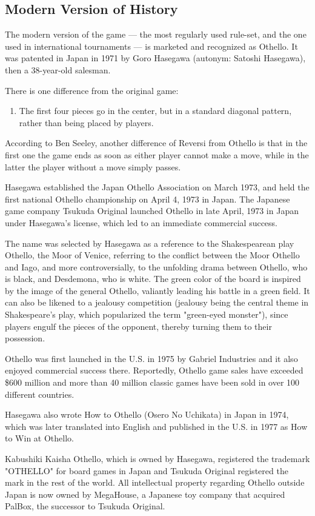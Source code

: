 \documentclass[a4paper]{report}
\begin{document}
\subsection{Modern Version of History}
The modern version of the game — the most regularly used rule-set, and the one used in international tournaments — is marketed and recognized as Othello. It was patented in Japan in 1971 by Goro Hasegawa (autonym: Satoshi Hasegawa), then a 38-year-old salesman.
\par
There is one difference from the original game: 
\begin{enumerate}
\item The first four pieces go in the center, but in a standard diagonal pattern, rather than being placed by players.
\end{enumerate}
According to Ben Seeley, another difference of Reversi from Othello is that in the first one the game ends as soon as either player cannot make a move, while in the latter the player without a move simply passes.
\par
Hasegawa established the Japan Othello Association on March 1973, and held the first national Othello championship on April 4, 1973 in Japan. The Japanese game company Tsukuda Original launched Othello in late April, 1973 in Japan under Hasegawa’s license, which led to an immediate commercial success.
\par
The name was selected by Hasegawa as a reference to the Shakespearean play Othello, the Moor of Venice, referring to the conflict between the Moor Othello and Iago, and more controversially, to the unfolding drama between Othello, who is black, and Desdemona, who is white. The green color of the board is inspired by the image of the general Othello, valiantly leading his battle in a green field. It can also be likened to a jealousy competition (jealousy being the central theme in Shakespeare's play, which popularized the term "green-eyed monster"), since players engulf the pieces of the opponent, thereby turning them to their possession. 
\par
Othello was first launched in the U.S. in 1975 by Gabriel Industries and it also enjoyed commercial success there. Reportedly, Othello game sales have exceeded \$600 million and more than 40 million classic games have been sold in over 100 different countries. 
\par
Hasegawa also wrote How to Othello (Osero No Uchikata) in Japan in 1974, which was later translated into English and published in the U.S. in 1977 as How to Win at Othello.
\par
Kabushiki Kaisha Othello, which is owned by Hasegawa, registered the trademark "OTHELLO" for board games in Japan and Tsukuda Original registered the mark in the rest of the world. All intellectual property regarding Othello outside Japan is now owned by MegaHouse, a Japanese toy company that acquired PalBox, the successor to Tsukuda Original.
\end{document}
